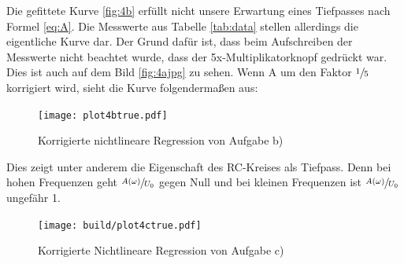 
Die gefittete Kurve \ref{fig:4b} erfüllt nicht unsere Erwartung eines Tiefpasses
nach Formel \eqref{eq:A}. Die Messwerte aus Tabelle \ref{tab:data} stellen allerdings die eigentliche Kurve
dar. Der Grund dafür ist, dass beim Aufschreiben der Messwerte nicht beachtet wurde,
dass der 5x-Multiplikatorknopf gedrückt war. Dies ist auch auf dem Bild \ref{fig:4ajpg}
zu sehen. Wenn A um den Faktor $\sfrac{1}{5}$ korrigiert wird, sieht die Kurve 
folgendermaßen aus:

\begin{figure}[H]
    \texttt{[image: plot4btrue.pdf]}
    \centering
    \caption{Korrigierte nichtlineare Regression von Aufgabe b)}
    \label{fig:4btrue}
\end{figure}

Dies zeigt unter anderem die Eigenschaft des RC-Kreises als Tiefpass.
Denn bei hohen Frequenzen geht $\sfrac{A(\omega)}{U_0}$  gegen Null und bei kleinen
Frequenzen ist $\sfrac{A(\omega)}{U_0}$ ungefähr 1.






  \begin{figure}[H]
    \texttt{[image: build/plot4ctrue.pdf]}
    \centering
    \caption{Korrigierte Nichtlineare Regression von Aufgabe c)}
    \label{fig:4ctrue}
  \end{figure}

\newpage
\nocite{V353}
\nocite{scipy}
\nocite{uncertainties}
\printbibliography
